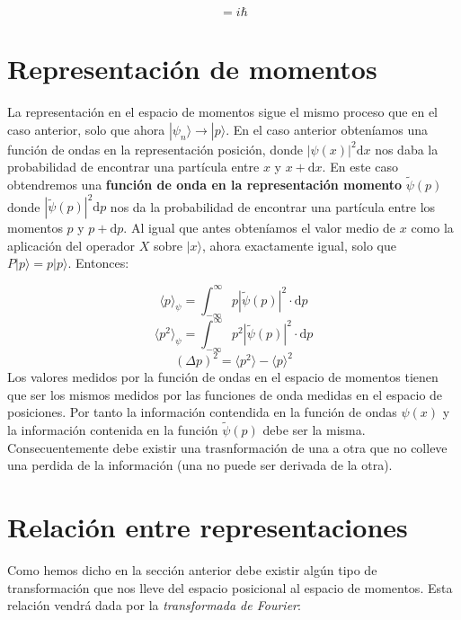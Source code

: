 \documentclass[12pt,a4paper]{book}
\numberwithin{equation}{chapter}
\numberwithin{figure}{chapter}
\newcommand{\D}{\mathrm{d}}
\newcommand{\intinf}{\int_{-\infty}^{\infty}}
\begin{document}
\begin{equation}
[X,P] = i \hbar
\end{equation}


\section{Representación de momentos}

La representación en el espacio de momentos sigue el mismo proceso que en el caso anterior, solo que ahora $|\psi_n\rangle \rightarrow |p\rangle$. En el caso anterior obteníamos una  función de ondas en la representación posición, donde $|\psi (x) |^2 \D x$ nos daba la probabilidad de encontrar una partícula entre $x$ y $x+\D x$. En este caso obtendremos una \textbf{función de onda en la representación momento} $\tilde{\psi} (p)$ donde $|\tilde{\psi} (p) |^2 \D p$ nos da la probabilidad de encontrar una partícula entre los momentos $p$ y $p+\D p$. Al igual que antes obteníamos el valor medio de $x$ como la aplicación del operador $X$ sobre $|x\rangle$, ahora exactamente igual, solo que $P |p\rangle = p |p \rangle$. Entonces:


\begin{equation}
\langle p \rangle_\psi = \intinf p|\tilde{\psi} (p)|^2 \cdot \D p
\end{equation}
\begin{equation}
\langle p^2 \rangle_\psi = \intinf p^2 |\tilde{\psi}  (p)|^2 \cdot \D p
\end{equation}
\begin{equation}
(\Delta p)^2 = \langle p^2 \rangle - \langle p \rangle^2
\end{equation}
Los valores medidos por la función de ondas en el espacio de momentos tienen que ser los mismos medidos por las funciones de onda medidas en el espacio de posiciones. Por tanto la información contendida en la función de ondas $\psi(x)$ y la información contenida en la función $\tilde{\psi} (p)$ debe ser la misma. Consecuentemente debe existir una trasnformación de una a otra que no colleve una perdida de la información (una no puede ser derivada de la otra).

\section{Relación entre representaciones}

Como hemos dicho en la sección anterior debe existir algún tipo de transformación que nos lleve del espacio posicional al espacio de momentos. Esta relación vendrá dada por la {\it transformada de Fourier}:
\end{document}
